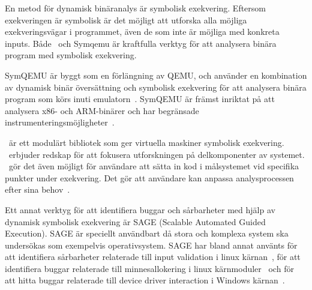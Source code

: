 En metod för dynamisk binäranalys är symbolisk exekvering. Eftersom exekveringen är symbolisk är 
det möjligt att utforska alla möjliga exekveringsvägar i programmet, även de som inte är möjliga
med konkreta inputs. Både \stoe\ och Symqemu är kraftfulla verktyg för att analysera binära program 
med symbolisk exekvering.

SymQEMU är byggt som en förlängning av QEMU, och använder en kombination av dynamisk binär 
översättning och symbolisk exekvering för att analysera binära program som körs inuti emulatorn~\cite{symqemu}.
SymQEMU är främst inriktat på att analysera x86- och ARM-binärer och har begränsade instrumenteringsmöjligheter~\cite{Sen2016Symbolic}.

\stoe\ är ett modulärt bibliotek som ger virtuella maskiner symbolisk exekvering. \stoe\ erbjuder 
redskap för att fokusera utforskningen på delkomponenter av systemet. \stoe\ gör det även 
möjligt för användare att sätta in kod i målsystemet vid specifika punkter under 
exekvering. Det gör att användare kan anpassa analysprocessen efter sina behov~\cite{s2e}. 

Ett annat verktyg för att identifiera buggar och sårbarheter med hjälp av dynamisk symbolisk 
exekvering är SAGE (Scalable Automated Guided Execution). SAGE är speciellt användbart då 
stora och komplexa system ska undersökas som exempelvis operativsystem. SAGE har bland annat 
använts för att identifiera sårbarheter relaterade till input validation i linux kärnan~\cite{dahse},
för att identifiera buggar relaterade till minnesallokering i linux kärnmoduler~\cite{avgerinos} och 
för att hitta buggar relaterade till device driver interaction i Windows kärnan~\cite{dawson}.
